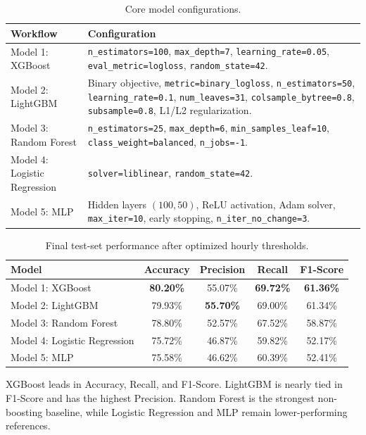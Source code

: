 \documentclass{llncs}
\begin{document}
\begin{table}[!htbp]
\centering
\caption{Core model configurations.}
\label{tab:model-configs}
\scriptsize
\begin{tabular}{L{0.24\textwidth}L{0.65\textwidth}}
\toprule
\textbf{Workflow} & \textbf{Configuration} \\
\midrule
Model 1: XGBoost & \texttt{n\_estimators=100}, \texttt{max\_depth=7}, \texttt{learning\_rate=0.05}, \texttt{eval\_metric=logloss}, \texttt{random\_state=42}. \\
Model 2: LightGBM & Binary objective, \texttt{metric=binary\_logloss}, \texttt{n\_estimators=50}, \texttt{learning\_rate=0.1}, \texttt{num\_leaves=31}, \texttt{colsample\_bytree=0.8}, \texttt{subsample=0.8}, L1/L2 regularization. \\
Model 3: Random Forest & \texttt{n\_estimators=25}, \texttt{max\_depth=6}, \texttt{min\_samples\_leaf=10}, \texttt{class\_weight=balanced}, \texttt{n\_jobs=-1}. \\
Model 4: Logistic Regression & \texttt{solver=liblinear}, \texttt{random\_state=42}. \\
Model 5: MLP & Hidden layers $(100,50)$, ReLU activation, Adam solver, \texttt{max\_iter=10}, early stopping, \texttt{n\_iter\_no\_change=3}. \\
\bottomrule
\end{tabular}
\end{table}

\begin{table}[!htbp]
\centering
\caption{Final test-set performance after optimized hourly thresholds.}
\label{tab:model-results}
\small
\begin{tabular}{lcccc}
\toprule
\textbf{Model} & \textbf{Accuracy} & \textbf{Precision} & \textbf{Recall} & \textbf{F1-Score} \\
\midrule
Model 1: XGBoost & \textbf{80.20\%} & 55.07\% & \textbf{69.72\%} & \textbf{61.36\%} \\
Model 2: LightGBM & 79.93\% & \textbf{55.70\%} & 69.00\% & 61.34\% \\
Model 3: Random Forest & 78.80\% & 52.57\% & 67.52\% & 58.87\% \\
Model 4: Logistic Regression & 75.72\% & 46.87\% & 59.82\% & 52.17\% \\
Model 5: MLP & 75.58\% & 46.62\% & 60.39\% & 52.41\% \\
\bottomrule
\end{tabular}
\end{table}

XGBoost leads in Accuracy, Recall, and F1-Score. LightGBM is nearly tied in F1-Score and has the highest Precision. Random Forest is the strongest non-boosting baseline, while Logistic Regression and MLP remain lower-performing references.
\end{document}
